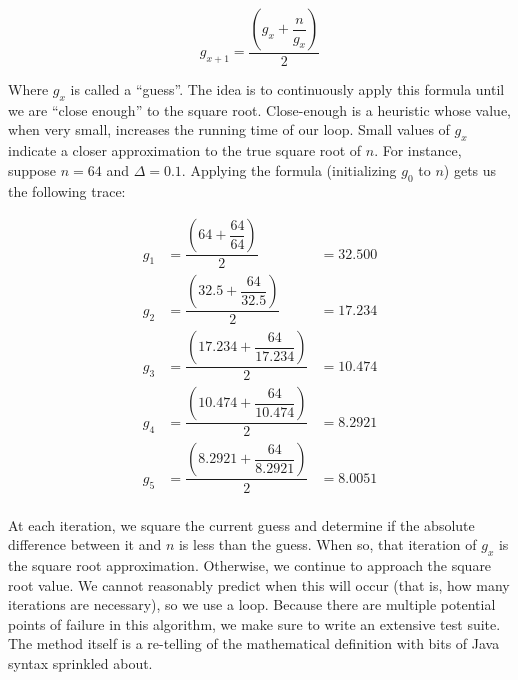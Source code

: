 
\[
    g_{x+1} = \dfrac{\left(g_x + \dfrac{n}{g_x}\right)}{2}
\]

Where $g_x$ is called a ``guess''. The idea is to continuously apply this formula until we are ``close enough'' to the square root. Close-enough is a heuristic whose value, when very small, increases the running time of our loop. Small values of $g_x$ indicate a closer approximation to the true square root of $n$. For instance, suppose $n=64$ and $\Delta=0.1$. Applying the formula (initializing $g_0$ to $n$) gets us the following trace:

\begin{align*}
g_1 &= \dfrac{\left(64 + \dfrac{64}{64}\right)}{2} &= 32.500\\
g_2 &= \dfrac{\left(32.5 + \dfrac{64}{32.5}\right)}{2} &= 17.234\\
g_3 &= \dfrac{\left(17.234 + \dfrac{64}{17.234}\right)}{2} &= 10.474\\
g_4 &= \dfrac{\left(10.474 + \dfrac{64}{10.474}\right)}{2} &= 8.2921\\
g_5 &= \dfrac{\left(8.2921 + \dfrac{64}{8.2921}\right)}{2} &= 8.0051\\
\end{align*}

At each iteration, we square the current guess and determine if the absolute difference between it and $n$ is less than the guess. When so, that iteration of $g_x$ is the square root approximation. Otherwise, we continue to approach the square root value. We cannot reasonably predict when this will occur (that is, how many iterations are necessary), so we use a  loop. Because there are multiple potential points of failure in this algorithm, we make sure to write an extensive test suite. The method itself is a re-telling of the mathematical definition with bits of Java syntax sprinkled about. 

